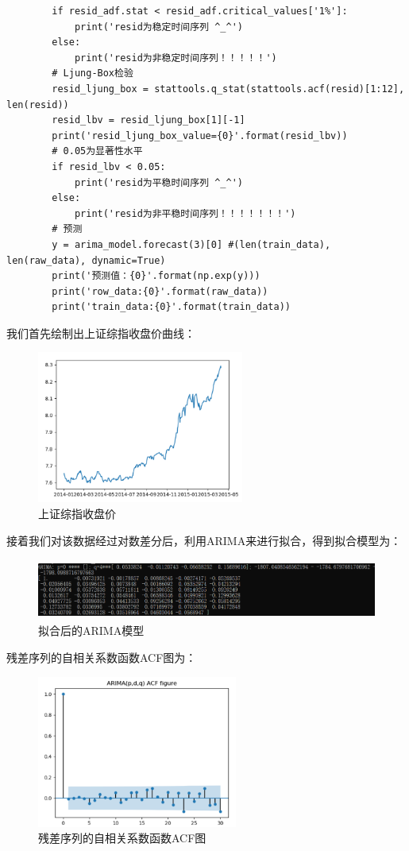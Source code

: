 \documentclass{article}
\begin{document}
\begin{lstlisting}
        if resid_adf.stat < resid_adf.critical_values['1%']:
            print('resid为稳定时间序列 ^_^')
        else:
            print('resid为非稳定时间序列！！！！！')
        # Ljung-Box检验
        resid_ljung_box = stattools.q_stat(stattools.acf(resid)[1:12], len(resid))
        resid_lbv = resid_ljung_box[1][-1]
        print('resid_ljung_box_value={0}'.format(resid_lbv))
        # 0.05为显著性水平
        if resid_lbv < 0.05:
            print('resid为平稳时间序列 ^_^')
        else:
            print('resid为非平稳时间序列！！！！！！！')
        # 预测
        y = arima_model.forecast(3)[0] #(len(train_data), len(raw_data), dynamic=True)
        print('预测值：{0}'.format(np.exp(y)))
        print('row_data:{0}'.format(raw_data))
        print('train_data:{0}'.format(train_data))
\end{lstlisting}
我们首先绘制出上证综指收盘价曲线：
\begin{figure}[H]
	\caption{上证综指收盘价}
	\label{f000023}
	\centering
	\includegraphics[height=5cm]{images/f000023}
\end{figure}
接着我们对该数据经过对数差分后，利用ARIMA来进行拟合，得到拟合模型为：
\begin{figure}[H]
	\caption{拟合后的ARIMA模型}
	\label{f000024}
	\centering
	\includegraphics[height=2cm]{images/f000024}
\end{figure}
残差序列的自相关系数函数ACF图为：
\begin{figure}[H]
	\caption{残差序列的自相关系数函数ACF图}
	\label{f000025}
	\centering
	\includegraphics[height=5cm]{images/f000025}
\end{figure}
\end{document}
